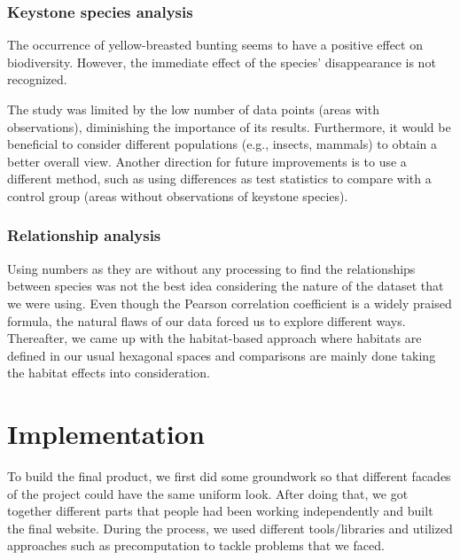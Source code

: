 \documentclass{article}
\begin{document}
\subsubsection{Keystone species analysis}
The occurrence of yellow-breasted bunting seems to have a positive effect on biodiversity. However, the immediate effect of the species’ disappearance is not recognized.
\par
The study was limited by the low number of data points (areas with observations), diminishing the importance of its results. Furthermore, it would be beneficial to consider different populations (e.g., insects, mammals) to obtain a better overall view. Another direction for future improvements is to use a different method, such as using differences as test statistics to compare with a control group (areas without observations of keystone species).

\subsubsection{Relationship analysis}
Using numbers as they are without any processing to find the relationships between species was not the best idea considering the nature of the dataset that we were using. Even though the Pearson correlation coefficient is a widely praised formula, the natural flaws of our data forced us to explore different ways. Thereafter, we came up with the habitat-based approach where habitats are defined in our usual hexagonal spaces and comparisons are mainly done taking the habitat effects into consideration.
\vspace*{-3mm}
\section{Implementation}
To build the final product, we first did some groundwork so that different facades of the project could have the same uniform look. After doing that, we got together different parts that people had been working independently and built the final website. During the process, we used different tools/libraries and utilized approaches such as precomputation to tackle problems that we faced.
\end{document}
